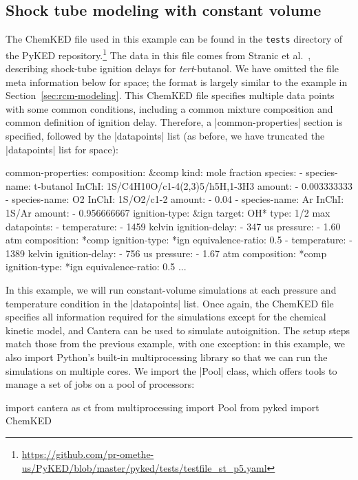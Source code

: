 \documentclass[12pt]{ijck}
\newcommand\ck{ChemKED}
\newcommand\pk{PyKED}
\begin{document}
\subsection{Shock tube modeling with constant volume}
\label{sec:shock-tube}

The \ck{} file used in this example can be found in the \texttt{tests} directory of the \pk{}
repository.\footnote{\url{https://github.com/pr-omethe-us/PyKED/blob/master/pyked/tests/testfile_st_p5.yaml}}
The data in this file comes from Stranic et al.~\autocite{Stranic:2012}, describing
shock-tube ignition delays for \textit{tert}-butanol. We have omitted the file
meta information below for space; the format is largely similar to the example in
Section~\ref{sec:rcm-modeling}.
This \ck{} file specifies multiple data points with some common
conditions, including a common mixture composition and common definition of
ignition delay. Therefore, a \yabox|common-properties| section is specified, followed by the
\yabox|datapoints| list (as before, we have truncated the \yabox|datapoints| list for space):
%
\begin{yamlbox}
common-properties:
  composition: &comp
    kind: mole fraction
    species:
      - species-name: t-butanol
        InChI: 1S/C4H10O/c1-4(2,3)5/h5H,1-3H3
        amount:
          - 0.003333333
      - species-name: O2
        InChI:  1S/O2/c1-2
        amount:
          - 0.04
      - species-name: Ar
        InChI:  1S/Ar
        amount:
          - 0.956666667
  ignition-type: &ign
    target: OH*
    type: 1/2 max
datapoints:
  - temperature:
      - 1459 kelvin
    ignition-delay:
      - 347 us
    pressure:
      - 1.60 atm
    composition: *comp
    ignition-type: *ign
    equivalence-ratio: 0.5
  - temperature:
      - 1389 kelvin
    ignition-delay:
      - 756 us
    pressure:
      - 1.67 atm
    composition: *comp
    ignition-type: *ign
    equivalence-ratio: 0.5
    ...
\end{yamlbox}

In this example, we will run constant-volume simulations at each
pressure and temperature condition in the \yabox|datapoints| list. Once again,
the \ck{} file specifies all information required for the simulations except
for the chemical kinetic model, and Cantera can be used to simulate autoignition. The setup steps
match those from the previous example, with one exception: in this example, we also import
Python's built-in multiprocessing library so that we can run the simulations on multiple cores.
We import the \pybox|Pool| class, which offers tools to manage a set of jobs on a
pool of processors:
%
\begin{pythonbox}
import cantera as ct
from multiprocessing import Pool
from pyked import ChemKED
\end{pythonbox}
\end{document}

